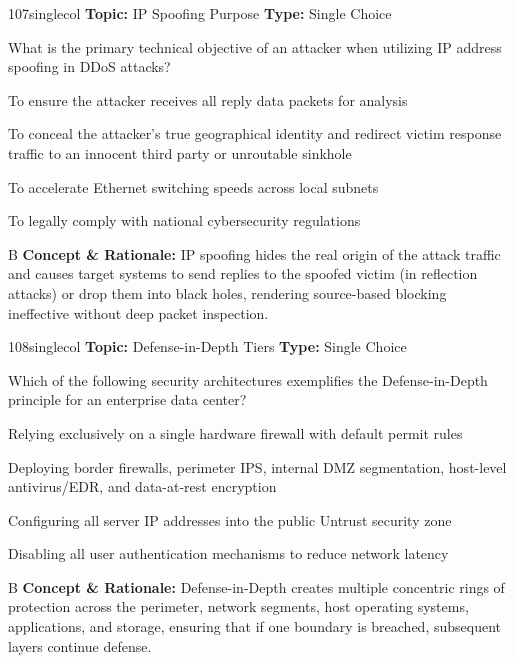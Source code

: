 \begin{qcard}{107}{singlecol}
\textcolor{darkslate!75}{\small\textbf{Topic:} IP Spoofing Purpose \hfill \textbf{Type:} Single Choice}\vspace{0.4em}\par
What is the primary technical objective of an attacker when utilizing IP address spoofing in DDoS attacks?
\begin{qoptions}
\item To ensure the attacker receives all reply data packets for analysis
\item To conceal the attacker's true geographical identity and redirect victim response traffic to an innocent third party or unroutable sinkhole
\item To accelerate Ethernet switching speeds across local subnets
\item To legally comply with national cybersecurity regulations
\end{qoptions}
\end{qcard}
\nopagebreak
\begin{explainbox}{B}
\textbf{Concept \& Rationale:} IP spoofing hides the real origin of the attack traffic and causes target systems to send replies to the spoofed victim (in reflection attacks) or drop them into black holes, rendering source-based blocking ineffective without deep packet inspection.
\end{explainbox}

\begin{qcard}{108}{singlecol}
\textcolor{darkslate!75}{\small\textbf{Topic:} Defense-in-Depth Tiers \hfill \textbf{Type:} Single Choice}\vspace{0.4em}\par
Which of the following security architectures exemplifies the Defense-in-Depth principle for an enterprise data center?
\begin{qoptions}
\item Relying exclusively on a single hardware firewall with default permit rules
\item Deploying border firewalls, perimeter IPS, internal DMZ segmentation, host-level antivirus/EDR, and data-at-rest encryption
\item Configuring all server IP addresses into the public Untrust security zone
\item Disabling all user authentication mechanisms to reduce network latency
\end{qoptions}
\end{qcard}
\nopagebreak
\begin{explainbox}{B}
\textbf{Concept \& Rationale:} Defense-in-Depth creates multiple concentric rings of protection across the perimeter, network segments, host operating systems, applications, and storage, ensuring that if one boundary is breached, subsequent layers continue defense.
\end{explainbox}

